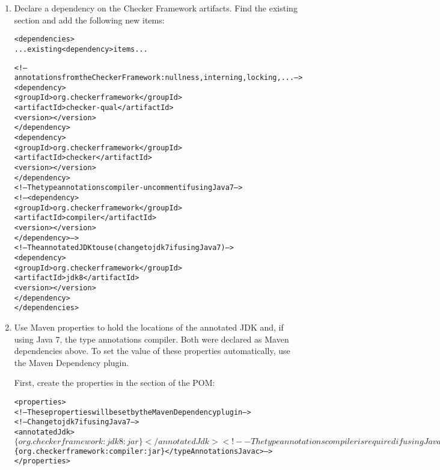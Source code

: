 \begin{enumerate}

\item Declare a dependency on the Checker Framework artifacts.  Find the
  existing  section and add the following new
   items:

\begin{alltt}
    <dependencies>
        ... existing <dependency> items ...

        <!-- annotations from the Checker Framework: nullness, interning, locking, ... -->
        <dependency>
            <groupId>org.checkerframework</groupId>
            <artifactId>checker-qual</artifactId>
            <version>\ReleaseVersion{}</version>
        </dependency>
        <dependency>
            <groupId>org.checkerframework</groupId>
            <artifactId>checker</artifactId>
            <version>\ReleaseVersion{}</version>
        </dependency>
        <!-- The type annotations compiler - uncomment if using Java 7 -->
        <!-- <dependency>
            <groupId>org.checkerframework</groupId>
            <artifactId>compiler</artifactId>
            <version>\ReleaseVersion{}</version>
        </dependency> -->
        <!-- The annotated JDK to use (change to jdk7 if using Java 7) -->
        <dependency>
            <groupId>org.checkerframework</groupId>
            <artifactId>jdk8</artifactId>
            <version>\ReleaseVersion{}</version>
        </dependency>
    </dependencies>
\end{alltt}

\item Use Maven properties to hold the locations of the
  annotated JDK and, if using Java 7, the type annotations compiler.  Both were declared as Maven dependencies above.
To set the value of these properties automatically, use the Maven Dependency plugin.

First, create the properties in the  section of the POM:

\begin{alltt}
<properties>
    <!-- These properties will be set by the Maven Dependency plugin -->
    <!-- Change to jdk7 if using Java 7 -->
    <annotatedJdk>$\{org.checkerframework:jdk8:jar\}</annotatedJdk>
    <!-- The type annotations compiler is required if using Java 7. -->
    <!-- Uncomment the following line if using Java 7. -->
    <!-- <typeAnnotationsJavac>$\{org.checkerframework:compiler:jar\}</typeAnnotationsJavac> -->
</properties>
\end{alltt}


\end{enumerate}
